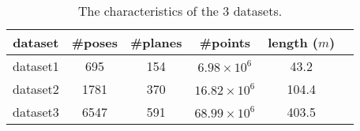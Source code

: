 \documentclass{vgtc}                          %
\begin{document}
\begin{table}[tb]
	\caption{The characteristics of the 3 datasets.}
	\label{tab:datasets}
	\scriptsize%
	\centering%
	\begin{tabular}{c c c c c c}
		\toprule
		dataset & \#poses &   \#planes &   \#points &   length ($m$)  \\
		\hline
		dataset1 & 695   & 154  & $6.98 \times 10^6$ &  43.2 \\
		dataset2 & 1781 & 370 & $16.82 \times 10^6$ &  104.4   \\
		dataset3 & 6547 &  591& $68.99 \times 10^6$  & 403.5\\
		\bottomrule
	\end{tabular}%
\end{table}
\end{document}
